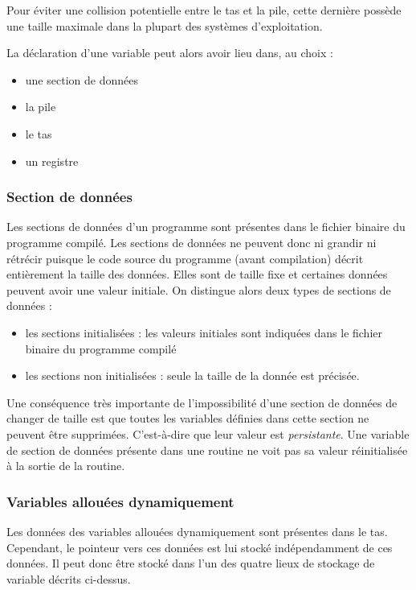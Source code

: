 \documentclass[../../../main.tex]{subfiles}
\begin{document}
\begin{minipage}{\textwidth}
	\begin{center}
		
	\end{center}
\end{minipage}

Pour éviter une collision potentielle entre le tas et la pile, cette dernière possède une taille maximale dans la plupart des systèmes d'exploitation.

La déclaration d'une variable peut alors avoir lieu dans, au choix :
\begin{itemize}
	\item une section de données
	\item la pile
	\item le tas
	\item un registre
\end{itemize}
\subsubsection{Section de données}
\label{ssub:section_de_donn_es}
Les sections de données d'un programme sont présentes dans le fichier binaire du programme compilé. Les sections de données ne peuvent donc ni grandir ni rétrécir puisque le code source du programme (avant compilation) décrit entièrement la taille des données. Elles sont de taille fixe et certaines données peuvent avoir une valeur initiale. On distingue alors deux types de sections de données :
\begin{itemize}
	\item les sections initialisées : les valeurs initiales sont indiquées dans le fichier binaire du programme compilé
	\item les sections non initialisées : seule la taille de la donnée est précisée.
\end{itemize}
Une conséquence très importante de l'impossibilité d'une section de données de changer de taille est que toutes les variables définies dans cette section ne peuvent être supprimées. C'est-à-dire que leur valeur est \textit{persistante}. Une variable de section de données présente dans une routine ne voit pas sa valeur réinitialisée à la sortie de la routine.
\subsubsection{Variables allouées dynamiquement}
\label{ssub:variables_allou_es_dynamiquement}
Les données des variables allouées dynamiquement sont présentes dans le tas. Cependant, le pointeur vers ces données est lui stocké indépendamment de ces données. Il peut donc être stocké dans l'un des quatre lieux de stockage de variable décrits ci-dessus.
\end{document}
